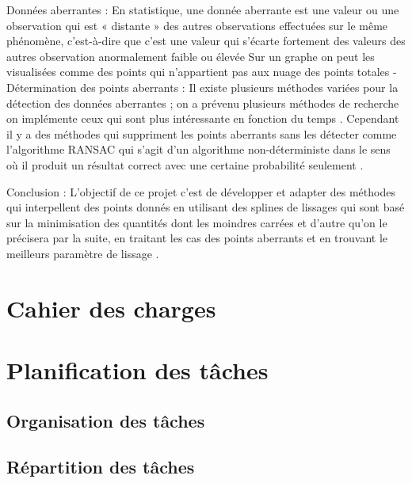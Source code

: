 \documentclass[a4paper,10pt]{article} %
\begin{document}
Données aberrantes :   
            En statistique, une donnée aberrante est une valeur ou une observation qui est « distante » des autres observations effectuées sur le même phénomène, c'est-à-dire que c’est une valeur qui s'écarte fortement des valeurs des autres observation anormalement faible ou élevée
                Sur un graphe on peut les visualisées comme des points qui n’appartient pas aux nuage des points totales
-          Détermination des points aberrants   :
Il existe plusieurs  méthodes variées pour la détection des données aberrantes ; on a prévenu plusieurs méthodes de recherche on implémente ceux qui sont plus intéressante en fonction du temps .
                Cependant  il y a des méthodes qui suppriment les points aberrants sans les détecter comme l’algorithme RANSAC qui s'agit d'un algorithme non-déterministe dans le sens où il produit un résultat correct avec une certaine probabilité seulement .
 
Conclusion :
            L’objectif de ce projet c’est de développer et adapter  des méthodes qui interpellent des points donnés en utilisant des splines de lissages qui sont basé sur la minimisation des 
quantités dont les  moindres carrées et d’autre qu’on le précisera par la suite, en traitant les cas des points aberrants et en trouvant  le meilleurs paramètre de lissage  .



\section{Cahier des charges}



\section{Planification des tâches}

	\subsection{Organisation des tâches}

	\subsection{Répartition des tâches}
\end{document}
